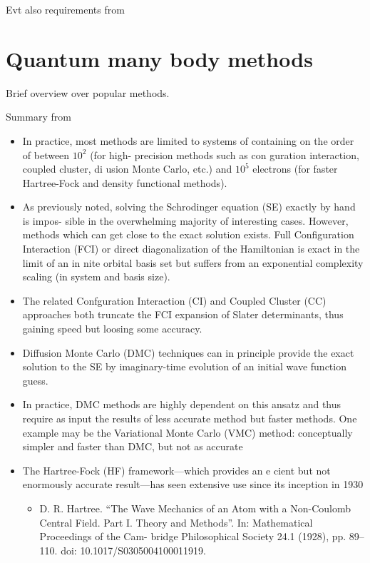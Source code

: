 \documentclass[twoside,english]{uiofysmaster}
\begin{document}
Evt also requirements from \cite{Ledum2017}

\section{Quantum many body methods}
Brief overview over popular methods.

Summary from \cite{Ledum2017}
\begin{itemize}
	\item In practice, most methods are limited to systems of containing on the order of between $10^2$ (for high- precision methods such as con guration interaction, coupled cluster, di usion Monte Carlo, etc.) and $10^5$ electrons (for faster Hartree-Fock and density functional methods).
	\cite{Hu2015} \cite{VandeVondele2012} \cite{Bowler2010}
	\item As previously noted, solving the Schrodinger equation (SE) exactly by hand is impos- sible in the overwhelming majority of interesting cases. However, methods which can get close to the exact solution exists. Full Configuration Interaction (FCI) or direct diagonalization of the Hamiltonian is exact in the limit of an in nite orbital basis set but suffers from an exponential complexity scaling (in system and basis size). \cite{Helgaker2000}
	\item The related Confguration Interaction (CI) and Coupled Cluster (CC) approaches both truncate the FCI expansion of Slater determinants, thus gaining speed but loosing some accuracy. \cite{Kvaal2017} \cite{Hammond1994}
	\item Diffusion Monte Carlo (DMC) techniques can in principle provide the exact solution to the SE by imaginary-time evolution of an initial wave function guess. \cite{HjortJensen2015} \cite{Hammond1994}
	\item In practice, DMC methods are highly dependent on this ansatz and thus require as input the results of less accurate method but faster methods. One example may be the Variational Monte Carlo (VMC) method: conceptually simpler and faster than DMC, but not as accurate
	\cite{Hammond1994}
	\item The Hartree-Fock (HF) framework—which provides an e cient but not enormously accurate result—has seen extensive use since its inception in 1930
	\begin{itemize}
		\item D. R. Hartree. “The Wave Mechanics of an Atom with a Non-Coulomb Central Field. Part I. Theory and Methods”. In: Mathematical Proceedings of the Cam- bridge Philosophical Society 24.1 (1928), pp. 89–110. doi: 10.1017/S0305004100011919.

\end{itemize}
\end{itemize}
\end{document}
